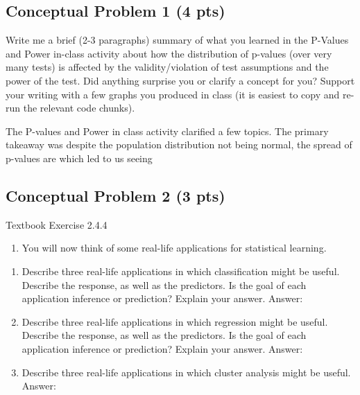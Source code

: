 \documentclass[
]{article}
\providecommand{\tightlist}{%
  \setlength{\itemsep}{0pt}\setlength{\parskip}{0pt}}
\begin{document}
\hypertarget{conceptual-problem-1-4-pts}{%
\subsection{Conceptual Problem 1 (4
pts)}\label{conceptual-problem-1-4-pts}}

Write me a brief (2-3 paragraphs) summary of what you learned in the
P-Values and Power in-class activity about how the distribution of
p-values (over very many tests) is affected by the validity/violation of
test assumptions and the power of the test. Did anything surprise you or
clarify a concept for you? Support your writing with a few graphs you
produced in class (it is easiest to copy and re-run the relevant code
chunks).

The P-values and Power in class activity clarified a few topics. The
primary takeaway was despite the population distribution not being
normal, the spread of p-values are which led to us seeing

\hypertarget{conceptual-problem-2-3-pts}{%
\subsection{Conceptual Problem 2 (3
pts)}\label{conceptual-problem-2-3-pts}}

Textbook Exercise 2.4.4

\begin{enumerate}
\def\labelenumi{\arabic{enumi}.}
\setcounter{enumi}{3}
\tightlist
\item
  You will now think of some real-life applications for statistical
  learning.
\end{enumerate}

\begin{enumerate}
\def\labelenumi{(\alph{enumi})}
\item
  Describe three real-life applications in which classification might be
  useful. Describe the response, as well as the predictors. Is the goal
  of each application inference or prediction? Explain your answer.
  Answer:
\item
  Describe three real-life applications in which regression might be
  useful. Describe the response, as well as the predictors. Is the goal
  of each application inference or prediction? Explain your answer.
  Answer:
\item
  Describe three real-life applications in which cluster analysis might
  be useful. Answer:
\end{enumerate}
\end{document}
